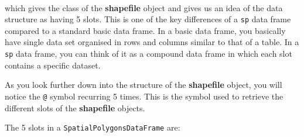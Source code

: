 \documentclass[12pt,a4paper,a4paper]{book}
\theoremstyle{definition}
\theoremstyle{definition}
\theoremstyle{definition}
\theoremstyle{remark}
\begin{document}
~

which gives the class of the \textbf{shapefile} object and gives us an
idea of the data structure as having 5 slots. This is one of the key
differences of a \texttt{sp} data frame compared to a standard basic
data frame. In a basic data frame, you basically have single data set
organised in rows and columns similar to that of a table. In a
\texttt{sp} data frame, you can think of it as a compound data frame in
which each slot contains a specific dataset.

As you look further down into the structure of the \textbf{shapefile}
object, you will notice the \texttt{@} symbol recurring 5 times. This is
the symbol used to retrieve the different slots of the
\textbf{shapefile} objects.

\newpage

The 5 slots in a \texttt{SpatialPolygonsDataFrame} are:

~
\end{document}
